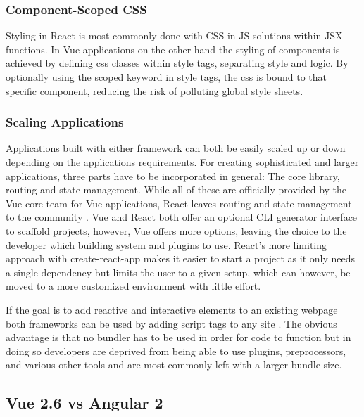 \subsubsection{Component-Scoped CSS}
Styling in React is most commonly done with CSS-in-JS solutions within JSX functions. In Vue applications on the other hand the styling of components is achieved by defining css classes within style tags, separating style and logic. By optionally using the scoped keyword in style tags, the css is bound to that specific component, reducing the risk of polluting global style sheets. 

\subsubsection{Scaling Applications}
Applications built with either framework can both be easily scaled up or down depending on the applications requirements. For creating sophisticated and larger applications, three parts have to be incorporated in general: The core library, routing and state management. While all of these are officially provided by the Vue core team for Vue applications, React leaves routing and state management to the community \cite{ComparisonVue:online}. Vue and React both offer an optional CLI generator interface to scaffold projects, however, Vue offers more options, leaving the choice to the developer which building system and plugins to use. React's more limiting approach with create-react-app makes it easier to start a project as it only needs a single dependency but limits the user to a given setup, which can however, be moved to a more customized environment with little effort.

If the goal is to add reactive and interactive elements to an existing webpage both frameworks can be used by adding script tags to any site \cite{AddingReact:online, ComparisonVue:online}. The obvious advantage is that no bundler has to be used in order for code to function but in doing so developers are deprived from being able to use plugins, preprocessors, and various other tools and are most commonly left with a larger bundle size.

\subsection{Vue 2.6 vs Angular 2 }

